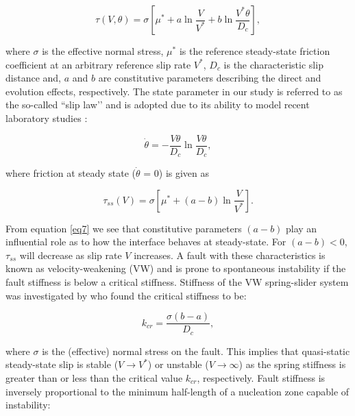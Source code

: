 \documentclass[final,3p, 11pt,authoryear]{elsarticle}
\begin{document}
\begin{equation}
\label{eq5}
\tau \left( V,\theta \right) = \sigma \left[\mu^{*} + a \ln\frac{V}{V^{*}} + b \ln\frac{V^{*}\theta}{D_{c}}\right],
\end{equation}   

\noindent where $\sigma$ is the effective normal stress, $\mu^{*}$ is the reference steady-state friction coefficient at an arbitrary reference slip rate $V^{*}$, $D_{c}$ is the characteristic slip distance and, $a$ and $b$ are constitutive parameters describing the direct and evolution effects, respectively.  The state parameter in our study is referred to as the so-called ``slip law’’ and is adopted due to its ability to model recent laboratory studies \citep{Bhattacharya2015, Kaneko2011, Kaneko2016}:

\begin{equation}
\label{eq6}
\dot{\theta} = - \frac{V\theta}{D_{c}}\ln\frac{V\theta}{D_{c}},
\end{equation}   

\noindent where friction at steady state ($\dot{\theta} $ = 0) is given as

\begin{equation}
\label{eq7}
\tau_{ss} \left( V \right) = \sigma \left[\mu^{*} + \left(a - b \right)\ln\frac{V}{V^{*}}\right].
\end{equation}   

\noindent From equation \eqref{eq7} we see that constitutive parameters $\left(a - b \right)$ play an influential role as to how the interface behaves at steady-state.  For $\left(a - b \right) < 0$, $\tau_{ss}$ will decrease as slip rate $V$ increases.  A fault with these characteristics is known as velocity-weakening (VW) and is prone to spontaneous instability if the fault stiffness is below a critical stiffness. Stiffness of the VW spring-slider system was investigated by \citet{Ranjith1999} who found the critical stiffness to be:

\begin{equation}
\label{eq9}
k_{cr}=\frac{\sigma \left( b-a \right)}{D_{c}},
\end{equation}   

\noindent where $\sigma$ is the (effective) normal stress on the fault. This implies that quasi-static steady-state slip is stable ($V \rightarrow V^{*}$) or unstable ($V \rightarrow \infty$) as the spring stiffness is greater than or less than the critical value $k_{cr}$, respectively. Fault stiffness is inversely proportional to the minimum half-length of a nucleation zone capable of instability:
\end{document}
